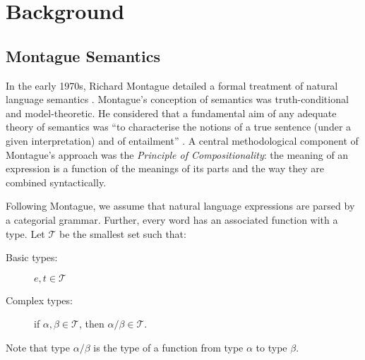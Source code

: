 \documentclass[a4paper,11pt]{article}
\renewcommand{\cite}{\citep}
\theoremstyle{definition}
\begin{document}

\section{Background}

\subsection{Montague Semantics}

In the early 1970s, 
Richard Montague detailed a formal treatment of natural language semantics \cite{Montague1970a,Montague1970b,Montague1973}. Montague's conception of semantics was truth-conditional and model-theoretic. He considered that a fundamental aim of any adequate theory of semantics was ``to characterise the notions of a true sentence (under a given interpretation) and of entailment'' \cite{Montague1970b}. A central methodological component of Montague's approach was the {\em Principle of Compositionality\/}: the meaning of an expression is a function of the meanings of its parts and the way they are combined syntactically.

Following Montague, we assume that natural language expressions
are parsed by a categorial grammar. Further,  every word has an
associated function with a type. Let $\mathcal{T}$ be the smallest set such that:
\begin{description}
\item [Basic types:] $e,t\in \mathcal{T}$
\item[Complex types:]  if $\alpha, \beta\in \mathcal{T}$, then $\alpha/\beta\in \mathcal{T}$.
\end{description}
Note that type $\alpha/\beta$ is the type of a function from type
$\alpha$ to type $\beta$.
\end{document}
